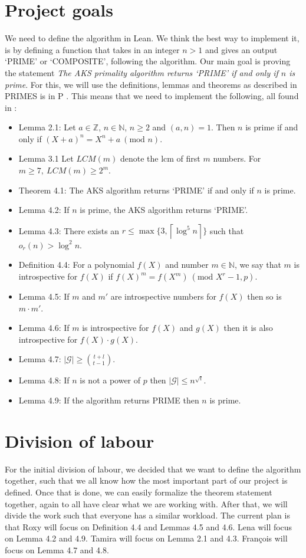 \documentclass[10pt,a4paper]{article}
\newcommand{\0}{\textbf{0}}
\newcommand{\N}{\mathbb{N}}
\newcommand{\Z}{\mathbb{Z}}
\begin{document}
	\section*{Project goals}
	We need to define the algorithm in Lean. We think the best way to implement it, is by defining a function that takes in an integer $n>1$ and gives an output `PRIME' or `COMPOSITE', following the algorithm.
	Our main goal is proving the statement \textit{The AKS primality algorithm returns `PRIME' if and only if $n$ is prime}.
	For this, we will use the definitions, lemmas and theorems as described in PRIMES is in P \cite{PRIMES in P}. This means that we need to implement the following, all found in \cite{PRIMES in P}:
	\begin{itemize}
		\item Lemma 2.1: Let $a\in\Z$, $n\in\N$, $n\geq2$ and $(a,n)=1$. Then $n$ is prime if and only if $(X+a)^n=X^n+a \ (\text{mod } n)$.
  		\item Lemma 3.1 Let $LCM(m)$ denote the lcm of first $m$ numbers. For $m \ge 7,\ LCM(m) \ge 2^m$.
		\item Theorem 4.1: The AKS algorithm returns `PRIME' if and only if $n$ is prime.
		\item Lemma 4.2: If $n$ is prime, the AKS algorithm returns `PRIME'.
		\item Lemma 4.3: There exists an $r\leq \max\{3,\left\lceil \log^5n\right\rceil\}$ such that $o_r(n)>\log^2n$.
		\item Definition 4.4: For a polynomial $f(X)$ and number $m\in\N$, we say that $m$ is introspective for $f(X)$ if $f(X)^m=f(X^m)\ (\text{mod } X^r-1,p)$.
		\item Lemma 4.5: If $m$ and $m'$ are introspective numbers for $f (X)$ then so is $m \cdot m'$.
		\item Lemma 4.6: If $m$ is introspective for $f(X)$ and $g(X)$ then it is also introspective for $f (X) \cdot g(X)$.
		\item Lemma 4.7: $|\mathcal{G}| \ge {t+l \choose t-1} $.
		\item Lemma 4.8: If $n$ is not a power of $p$ then $|\mathcal{G}|\le n^{\sqrt t}$.
		\item Lemma 4.9: If the algorithm returns PRIME then $n$ is prime.
	\end{itemize}
	
	\section*{Division of labour}
	For the initial division of labour, we decided that we want to define the algorithm together, such that we all know how the most important part of our project is defined.
	Once that is done, we can easily formalize the theorem statement together, again to all have clear what we are working with.
	After that, we will divide the work such that everyone has a similar workload. 
	The current plan is that Roxy will focus on Definition 4.4 and Lemmas 4.5 and 4.6. 
	Lena will focus on Lemma 4.2 and 4.9.
	Tamira will focus on Lemma 2.1 and 4.3.
	Fran\c{c}ois will focus on Lemma 4.7 and 4.8.
	
\end{document}
